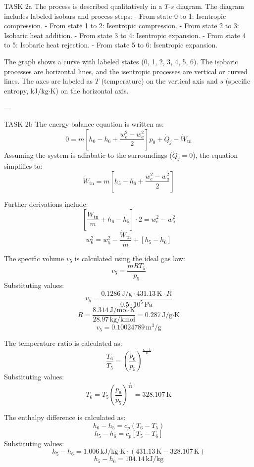 TASK 2a  
The process is described qualitatively in a \( T \)-\( s \) diagram. The diagram includes labeled isobars and process steps:  
- From state 0 to 1: Isentropic compression.  
- From state 1 to 2: Isentropic compression.  
- From state 2 to 3: Isobaric heat addition.  
- From state 3 to 4: Isentropic expansion.  
- From state 4 to 5: Isobaric heat rejection.  
- From state 5 to 6: Isentropic expansion.  

The graph shows a curve with labeled states (0, 1, 2, 3, 4, 5, 6). The isobaric processes are horizontal lines, and the isentropic processes are vertical or curved lines. The axes are labeled as \( T \) (temperature) on the vertical axis and \( s \) (specific entropy, \( \text{kJ/kg·K} \)) on the horizontal axis.

---

TASK 2b  
The energy balance equation is written as:  
\[
0 = \dot{m} \left[ h_0 - h_6 + \frac{w_e^2 - w_a^2}{2} \right] p_0 + \dot{Q}_j - \dot{W}_{\text{tn}}
\]  
Assuming the system is adiabatic to the surroundings (\( \dot{Q}_j = 0 \)), the equation simplifies to:  
\[
\dot{W}_{\text{tn}} = m \left[ h_5 - h_6 + \frac{w_e^2 - w_a^2}{2} \right]
\]  

Further derivations include:  
\[
\left[ \frac{\dot{W}_{\text{tn}}}{m} + h_6 - h_5 \right] \cdot 2 = w_e^2 - w_a^2
\]  
\[
w_6^2 = w_5^2 - \frac{\dot{W}_{\text{tn}}}{\dot{m}} + \left[ h_5 - h_6 \right]
\]  

The specific volume \( v_5 \) is calculated using the ideal gas law:  
\[
v_5 = \frac{mRT_5}{p_5}
\]  
Substituting values:  
\[
v_5 = \frac{0.1286 \, \text{J/g} \cdot 431.13 \, \text{K} \cdot R}{0.5 \cdot 10^5 \, \text{Pa}}
\]  
\[
R = \frac{8.314 \, \text{J/mol·K}}{28.97 \, \text{kg/kmol}} = 0.287 \, \text{J/g·K}
\]  
\[
v_5 = 0.10024789 \, \text{m}^3/\text{g}
\]  

The temperature ratio is calculated as:  
\[
\frac{T_6}{T_5} = \left( \frac{p_6}{p_5} \right)^{\frac{\kappa - 1}{\kappa}}
\]  
Substituting values:  
\[
T_6 = T_5 \left( \frac{p_6}{p_5} \right)^{\frac{4}{14}} = 328.107 \, \text{K}
\]  

The enthalpy difference is calculated as:  
\[
h_6 - h_5 = c_p \left( T_6 - T_5 \right)
\]  
\[
h_5 - h_6 = c_p \left[ T_5 - T_6 \right]
\]  
Substituting values:  
\[
h_5 - h_6 = 1.006 \, \text{kJ/kg·K} \cdot \left( 431.13 \, \text{K} - 328.107 \, \text{K} \right)
\]  
\[
h_5 - h_6 = 104.14 \, \text{kJ/kg}
\]